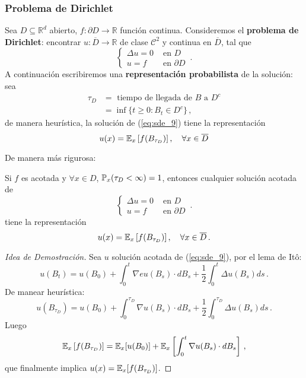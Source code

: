 \subsubsection{Problema de Dirichlet}
Sea $D \subseteq \mathbb{R}^d$ abierto, $f:\partial D \to \mathbb{R}$ función continua. Consideremos el \textbf{problema de Dirichlet}: encontrar $u: \overline{D} \to  \mathbb{R}$ de clase $\mathcal{C}^2$ y continua en $\overline{D}$, tal que 
\begin{equation*}
    \label{eq:sde_9}
    \tag{D}
    \begin{cases}
        \Delta u = 0 & \text{ en } D \\ 
        u = f & \text{ en } \partial D
    \end{cases} \,.
\end{equation*}
A continuación escribiremos una \textbf{representación probabilista} de la solución: sea 
\begin{align*}
    \tau_D & = \text{ tiempo de llegada de } B \text{ a }  D^{c} \\
    &= \inf \{ t \ge 0 : B_t \in D^{c} \} \,,
\end{align*}
de manera heurística, la solución de (\ref{eq:sde_9}) tiene la representación 
\begin{equation*}
    \label{eq:sde_10} 
    u(x) = \E_{x} \left[ f(B_{\tau_D}) \right], ~ ~ ~ \forall x \in \overline{D}
\end{equation*}

De manera más rigurosa:
\begin{theorem}
    Si $f$ es acotada y $\forall x \in D$, $\P_x ( \tau_D < \infty) = 1$, entonces cualquier solución acotada de
    \begin{equation*}
        \tag{D}
        \begin{cases}
            \Delta u = 0 & \text{ en } D \\ 
            u = f & \text{ en } \partial D
        \end{cases} \,.
    \end{equation*}
    tiene la representación
    $$ u(x) = \E_{x} \left[ f(B_{\tau_D}) \right], ~ ~ ~ \forall x \in \overline{D}\,.$$
\end{theorem}
\begin{proof}[Idea de Demostración]
\gris
Sea $u$ solución acotada de (\ref{eq:sde_9}), por el lema de It\^{o}: 
\begin{equation*}
    u(B_t) = u(B_0) + \int_{0}^{t} \nabla e u (B_s) \cdot dB_s + \frac{1}{2} \int_{0}^{t} \Delta u(B_s) ds \,.
\end{equation*}
De manear heurística: 
\begin{equation*}
    u(B_{\tau_D}) = u(B_0) + \int_{0}^{\tau_D} \nabla u(B_s) \cdot  dB_s + \frac{1}{2} \int_{0}^{\tau_D} \Delta u(B_s) ds \,.
\end{equation*}
Luego 
\begin{align*}
    \E_x \left[ f(B_{\tau_D}) \right] = \E_x[u(B_0)] + \E_x \left[ \int_{0}^{t} \nabla u (B_s) \cdot dB_s \right] \,,
\end{align*}
que finalmente implica $u(x) = \E_x[f(B_{\tau_{D}})]$.
\findem
\negro
\end{proof}

